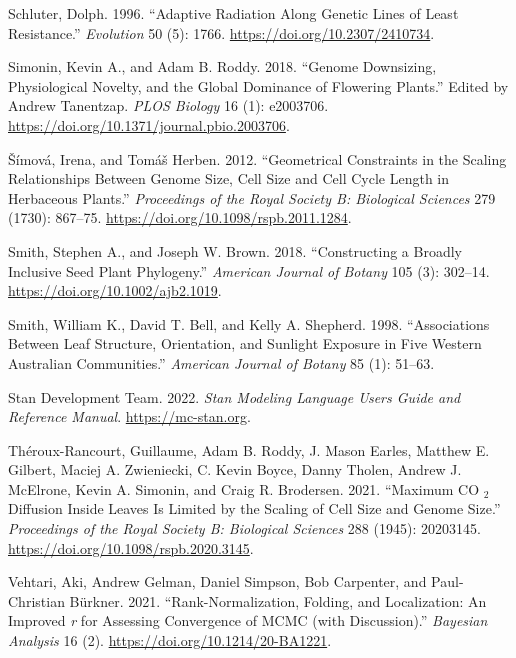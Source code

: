 \documentclass[
  12pt,
]{article}
\newlength{\cslhangindent}
\newlength{\cslentryspacingunit} %
\newenvironment{CSLReferences}[2] %
 {%
  \setlength{\parindent}{0pt}
  \ifodd #1
  \let\oldpar\par
  \def\par{\hangindent=\cslhangindent\oldpar}
  \fi
  \setlength{\parskip}{#2\cslentryspacingunit}
 }%
 {}
\begin{document}
\begin{CSLReferences}{1}{0}
\leavevmode{}%
Schluter, Dolph. 1996. {``Adaptive {Radiation} {Along} {Genetic} {Lines} of {Least} {Resistance}.''} \emph{Evolution} 50 (5): 1766. \url{https://doi.org/10.2307/2410734}.

\leavevmode{}%
Simonin, Kevin A., and Adam B. Roddy. 2018. {``Genome Downsizing, Physiological Novelty, and the Global Dominance of Flowering Plants.''} Edited by Andrew Tanentzap. \emph{PLOS Biology} 16 (1): e2003706. \url{https://doi.org/10.1371/journal.pbio.2003706}.

\leavevmode{}%
Šímová, Irena, and Tomáš Herben. 2012. {``Geometrical Constraints in the Scaling Relationships Between Genome Size, Cell Size and Cell Cycle Length in Herbaceous Plants.''} \emph{Proceedings of the Royal Society B: Biological Sciences} 279 (1730): 867--75. \url{https://doi.org/10.1098/rspb.2011.1284}.

\leavevmode{}%
Smith, Stephen A., and Joseph W. Brown. 2018. {``Constructing a Broadly Inclusive Seed Plant Phylogeny.''} \emph{American Journal of Botany} 105 (3): 302--14. \url{https://doi.org/10.1002/ajb2.1019}.

\leavevmode{}%
Smith, William K., David T. Bell, and Kelly A. Shepherd. 1998. {``Associations Between Leaf Structure, Orientation, and Sunlight Exposure in Five {Western} {Australian} Communities.''} \emph{American Journal of Botany} 85 (1): 51--63.

\leavevmode{}%
Stan Development Team. 2022. \emph{Stan {Modeling} {Language} {Users} {Guide} and {Reference} {Manual}}. \url{https://mc-stan.org}.

\leavevmode{}%
Théroux-Rancourt, Guillaume, Adam B. Roddy, J. Mason Earles, Matthew E. Gilbert, Maciej A. Zwieniecki, C. Kevin Boyce, Danny Tholen, Andrew J. McElrone, Kevin A. Simonin, and Craig R. Brodersen. 2021. {``Maximum {CO} \(_{\textrm{2}}\) Diffusion Inside Leaves Is Limited by the Scaling of Cell Size and Genome Size.''} \emph{Proceedings of the Royal Society B: Biological Sciences} 288 (1945): 20203145. \url{https://doi.org/10.1098/rspb.2020.3145}.

\leavevmode{}%
Vehtari, Aki, Andrew Gelman, Daniel Simpson, Bob Carpenter, and Paul-Christian Bürkner. 2021. {``Rank-{Normalization}, {Folding}, and {Localization}: {An} {Improved} \emph{r} for {Assessing} {Convergence} of {MCMC} (with {Discussion}).''} \emph{Bayesian Analysis} 16 (2). \url{https://doi.org/10.1214/20-BA1221}.


\end{CSLReferences}
\end{document}
